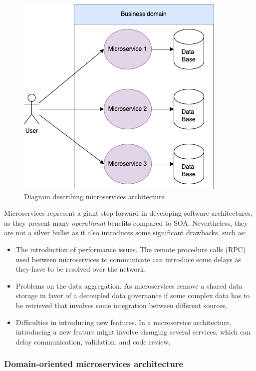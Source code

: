 \documentclass[english, 12pt, a4paper, sci, utf8, a-1b, online]{aaltothesis}
\begin{document}
\begin{figure}[h]
    \centering
    \includegraphics[scale=0.4]{src/thesis/img/literature-review/microservices.png}
    \caption{Diagram describing microservices architecture}
    \label{fig:microservices-architecture}
\end{figure}

Microservices represent a giant step forward in developing software architectures, as they present many \textit{operational} benefits compared to SOA. Nevertheless, they are not a silver bullet as it also introduces some significant drawbacks, such as:

\begin{itemize}
    \item The introduction of performance issues. The remote procedure calls (RPC) used between microservices to communicate can introduce some delays as they have to be resolved over the network.
    \item Problems on the data aggregation.  As microservices remove a shared data storage in favor of a decoupled data governance if some complex data has to be retrieved that involves some integration between different sources.
    \item Difficulties in introducing new features. In a microservice architecture, introducing a new feature might involve changing several services, which can delay communication, validation, and code review.
\end{itemize}

\subsubsection{Domain-oriented microservices architecture}
\label{sec:domain-oriented-microservices-architecture}
\end{document}
